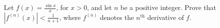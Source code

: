 Let \(f(x)=\frac{\sin x}{x}\), for \(x>0\), and let \(n\) be a positive integer. Prove that \(|f^{(n)}(x)|<\frac{1}{n+1}\), where \(f^{(n)}\) denotes the \(n^{\mathrm{th}}\) derivative of \(f\).